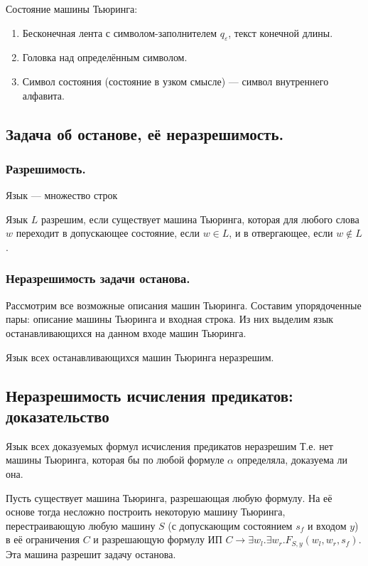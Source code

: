 \documentclass[10pt,a4paper,oneside]{article}
\begin{document}
 Состояние машины Тьюринга:
\begin{enumerate}
\item Бесконечная лента с символом-заполнителем $q_\varepsilon$, текст конечной длины.
\item Головка над определённым символом.
\item Символ состояния (состояние в узком смысле) --- символ внутреннего алфавита.
\end{enumerate}

\subsection{Задача об останове, её неразрешимость.}
\subsubsection{Разрешимость.}
 Язык --- множество строк

 Язык $L$ разрешим, если существует машина Тьюринга, которая для любого слова $w$ переходит в допускающее состояние, если $w \in L$,
и в отвергающее, если $w \notin L$.

\subsubsection{Неразрешимость задачи останова.}
 Рассмотрим все возможные описания машин Тьюринга. Составим упорядоченные пары: описание машины Тьюринга и входная строка.
Из них выделим язык останавливающихся на данном входе машин Тьюринга.

 Язык всех останавливающихся машин Тьюринга неразрешим.

\subsection{Неразрешимость исчисления предикатов: доказательство}
 Язык всех доказуемых формул исчисления предикатов неразрешим
Т.е. нет машины Тьюринга, которая бы по любой формуле $\alpha$ определяла, доказуема ли она.

  Пусть существует машина Тьюринга, разрешающая любую формулу.
На её основе тогда несложно построить некоторую машину Тьюринга, перестраивающую любую машину $S$ (с допускающим состоянием $s_f$ и входом $y$) 
в её ограничения $C$ и разрешающую формулу ИП $C \rightarrow \exists w_l.\exists w_r.F_{S,y}(w_l,w_r,s_f)$. 
Эта машина разрешит задачу останова.
\end{document}
